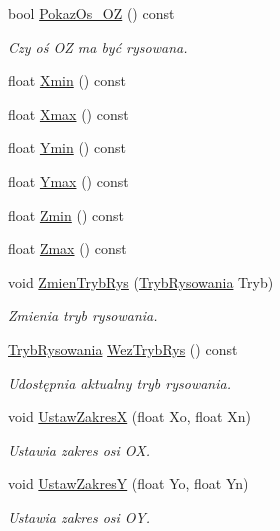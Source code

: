 \begin{DoxyCompactItemize}
bool \hyperlink{classPzG_1_1LaczeDoGNUPlota_a22c708af33c57bf3b5d1b4e82b4017b7}{Pokaz\+Os\+\_\+\+OZ} () const
\begin{DoxyCompactList}\small\item\em Czy oś OZ ma być rysowana. \end{DoxyCompactList}\item 
float \hyperlink{classPzG_1_1LaczeDoGNUPlota_a66836c9749bf179420e4ca3e9447efd7}{Xmin} () const
\item 
float \hyperlink{classPzG_1_1LaczeDoGNUPlota_a8e23479629af3df3d352b7839ae396b8}{Xmax} () const
\item 
float \hyperlink{classPzG_1_1LaczeDoGNUPlota_a9352c0382bfaeaaba9f65399a7383164}{Ymin} () const
\item 
float \hyperlink{classPzG_1_1LaczeDoGNUPlota_ac54e4e7448ce3bd324efdc94a999f535}{Ymax} () const
\item 
float \hyperlink{classPzG_1_1LaczeDoGNUPlota_a9068bd9a9873ba9c6d70016f1ae7cd7f}{Zmin} () const
\item 
float \hyperlink{classPzG_1_1LaczeDoGNUPlota_a20a5d03e1fc19c682032bffc54340f12}{Zmax} () const
\item 
void \hyperlink{classPzG_1_1LaczeDoGNUPlota_a10950349b348fd3a3d4143e95337527c}{Zmien\+Tryb\+Rys} (\hyperlink{namespacePzG_aeedae1ef10c66d720f9e89de408ca4ca}{Tryb\+Rysowania} Tryb)
\begin{DoxyCompactList}\small\item\em Zmienia tryb rysowania. \end{DoxyCompactList}\item 
\hyperlink{namespacePzG_aeedae1ef10c66d720f9e89de408ca4ca}{Tryb\+Rysowania} \hyperlink{classPzG_1_1LaczeDoGNUPlota_a7c417f27b4b112f58a5be3ce6ea8d1fe}{Wez\+Tryb\+Rys} () const
\begin{DoxyCompactList}\small\item\em Udostępnia aktualny tryb rysowania. \end{DoxyCompactList}\item 
void \hyperlink{classPzG_1_1LaczeDoGNUPlota_a9c91987dfc869d6fcea96205c581daef}{Ustaw\+ZakresX} (float Xo, float Xn)
\begin{DoxyCompactList}\small\item\em Ustawia zakres osi {\itshape OX}. \end{DoxyCompactList}\item 
void \hyperlink{classPzG_1_1LaczeDoGNUPlota_a54c6e9cf9ab2eae479451fd953c2717c}{Ustaw\+ZakresY} (float Yo, float Yn)
\begin{DoxyCompactList}\small\item\em Ustawia zakres osi {\itshape OY}. \end{DoxyCompactList}\item 

\end{DoxyCompactItemize}
